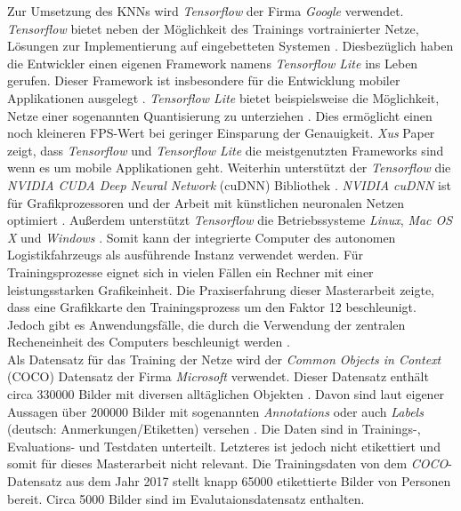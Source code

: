 		Zur Umsetzung des KNNs wird \textit{Tensorflow} der Firma \textit{Google} verwendet. \textit{Tensorflow} bietet neben der Möglichkeit des Trainings vortrainierter Netze, Lösungen zur Implementierung auf eingebetteten Systemen \cite{frameworks}. Diesbezüglich haben die Entwickler einen eigenen Framework namens \textit{Tensorflow Lite} ins Leben gerufen. Dieser Framework ist insbesondere für die Entwicklung mobiler Applikationen ausgelegt \cite{tflite}. \textit{Tensorflow Lite} bietet beispielsweise die Möglichkeit, Netze einer sogenannten Quantisierung zu unterziehen \cite{tflite}. Dies ermöglicht einen noch kleineren FPS-Wert bei geringer Einsparung der Genauigkeit. \textit{Xus} Paper zeigt, dass \textit{Tensorflow} und \textit{Tensorflow Lite} die meistgenutzten Frameworks sind wenn es um mobile Applikationen geht. Weiterhin unterstützt der \textit{Tensorflow} die \textit{NVIDIA CUDA Deep Neural Network} (cuDNN) Bibliothek \cite{frameworks}. \textit{NVIDIA cuDNN} ist für Grafikprozessoren und der Arbeit mit künstlichen neuronalen Netzen optimiert \cite{frameworks}. Außerdem unterstützt \textit{Tensorflow} die Betriebssysteme \textit{Linux}, \textit{Mac OS X} und \textit{Windows} \cite{frameworks}. Somit kann der integrierte Computer des autonomen Logistikfahrzeugs als ausführende Instanz verwendet werden. Für Trainingsprozesse eignet sich in vielen Fällen ein Rechner mit einer leistungsstarken Grafikeinheit. Die Praxiserfahrung dieser Masterarbeit zeigte, dass eine Grafikkarte den Trainingsprozess um den Faktor 12 beschleunigt. Jedoch gibt es Anwendungsfälle, die durch die Verwendung der zentralen Recheneinheit des Computers beschleunigt werden \cite{cpugpu}. \\
		
		Als Datensatz für das Training der Netze wird der \textit{Common Objects in Context} (COCO) Datensatz der Firma \textit{Microsoft} verwendet. Dieser Datensatz enthält circa 330000 Bilder mit diversen alltäglichen Objekten \cite{coco, cocopaper}. Davon sind laut eigener Aussagen über 200000 Bilder mit sogenannten \textit{Annotations} oder auch \textit{Labels} (deutsch: Anmerkungen/Etiketten) versehen \cite{coco}. Die Daten sind in Trainings-, Evaluations- und Testdaten unterteilt. Letzteres ist jedoch nicht etikettiert und somit für dieses Masterarbeit nicht relevant. Die Trainingsdaten von dem \textit{COCO}-Datensatz aus dem Jahr 2017 stellt knapp 65000 etikettierte Bilder von Personen bereit. Circa 5000 Bilder sind im Evalutaionsdatensatz enthalten.\\
		
